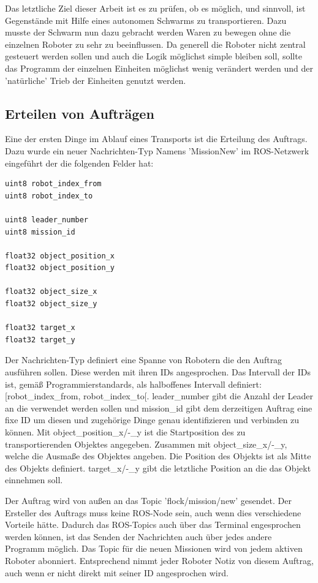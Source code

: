 Das letztliche Ziel dieser Arbeit ist es zu prüfen, ob es möglich, und sinnvoll, ist Gegenstände mit Hilfe eines autonomen Schwarms zu transportieren. Dazu musste der Schwarm nun dazu gebracht werden Waren zu bewegen ohne die einzelnen Roboter zu sehr zu beeinflussen. Da generell die Roboter nicht zentral gesteuert werden sollen und auch die Logik möglichst simple bleiben soll, sollte das Programm der einzelnen Einheiten möglichst wenig verändert werden und der 'natürliche' Trieb der Einheiten genutzt werden.

\subsection*{Erteilen von Aufträgen}

Eine der ersten Dinge im Ablauf eines Transports ist die Erteilung des Auftrags. Dazu wurde ein neuer Nachrichten-Typ Namens 'MissionNew' im ROS-Netzwerk eingeführt der die folgenden Felder hat:

\begin{lstlisting}[frame=L]
uint8 robot_index_from
uint8 robot_index_to

uint8 leader_number
uint8 mission_id

float32 object_position_x
float32 object_position_y

float32 object_size_x
float32 object_size_y

float32 target_x
float32 target_y
\end{lstlisting}

Der Nachrichten-Typ definiert eine Spanne von Robotern die den Auftrag ausführen sollen. Diese werden mit ihren IDs angesprochen. Das Intervall der IDs ist, gemäß Programmierstandards, als halboffenes Intervall definiert: [robot\_index\_from, robot\_index\_to[.
leader\_number gibt die Anzahl der Leader an die verwendet werden sollen und mission\_id gibt dem derzeitigen Auftrag eine fixe ID um diesen und zugehörige Dinge genau identifizieren und verbinden zu können.
Mit object\_position\_x/-\_y ist die Startposition des zu transportierenden Objektes angegeben. Zusammen mit object\_size\_x/-\_y, welche die Ausmaße des Objektes angeben. Die Position des Objekts ist als Mitte des Objekts definiert.
target\_x/-\_y gibt die letztliche Position an die das Objekt einnehmen soll.

Der Auftrag wird von außen an das Topic 'flock/mission/new' gesendet. Der Ersteller des Auftrags muss keine ROS-Node sein, auch wenn dies verschiedene Vorteile hätte. Dadurch das ROS-Topics auch über das Terminal engesprochen werden können, ist das Senden der Nachrichten auch über jedes andere Programm möglich. Das Topic für die neuen Missionen wird von jedem aktiven Roboter abonniert. Entsprechend nimmt jeder Roboter Notiz von diesem Auftrag, auch wenn er nicht direkt mit seiner ID angesprochen wird.

